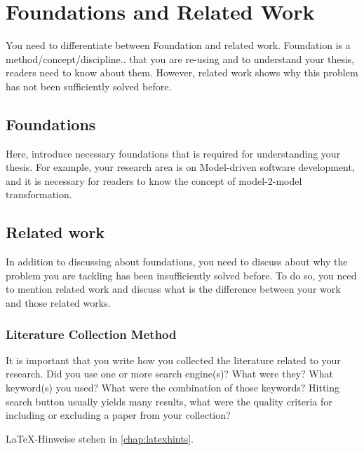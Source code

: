 
\chapter{Foundations and Related Work}
\label{chap:ch2}





You need to differentiate between Foundation and related work. Foundation is a method/concept/discipline.. that you are re-using and to understand your thesis, readers need to know about them. However, related work shows why this problem has not been sufficiently solved before.

\section{Foundations}
Here, introduce necessary foundations that is required for understanding your thesis. For example, your research area is on Model-driven software development, and it is necessary for readers to know the concept of model-2-model transformation.
\section{Related work}
In addition to discussing about foundations, you need to discuss about why the problem you are tackling has been insufficiently solved before. To do so, you need to mention related work and discuss what is the difference between your work and those related works.
\subsection{Literature Collection Method}
It is important that you write how you collected the literature related to your research. Did you use one or more search engine(s)? What were they? What keyword(s) you used? What were the combination of those keywords?
Hitting search button usually yields many results, what were the quality criteria for including or  excluding a paper from your collection?




LaTeX-Hinweise stehen in \cref{chap:latexhints}.


